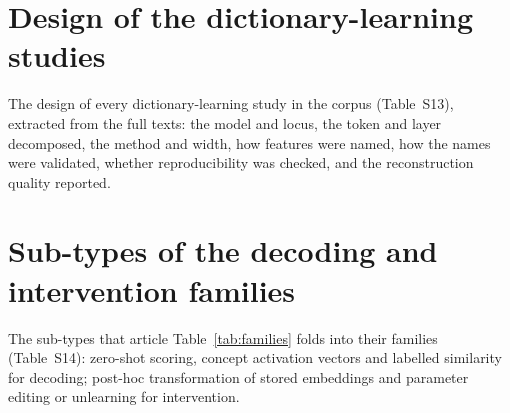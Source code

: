 \documentclass[final,3p,times,twocolumn,number,sort&compress]{elsarticle}
\begin{document}
\section*{Design of the dictionary-learning studies}
The design of every dictionary-learning study in the corpus (Table~S13), extracted from the full texts: the
model and locus, the token and layer decomposed, the method and width, how features were named, how the
names were validated, whether reproducibility was checked, and the reconstruction quality reported.
\renewcommand{\thetable}{S13}
\FloatBarrier

\section*{Sub-types of the decoding and intervention families}
The sub-types that article Table~\ref{tab:families} folds into their families (Table~S14): zero-shot
scoring, concept activation vectors and labelled similarity for decoding; post-hoc transformation of stored
embeddings and parameter editing or unlearning for intervention.
\renewcommand{\thetable}{S14}
\FloatBarrier
\clearpage


\end{document}
